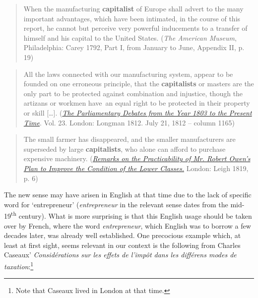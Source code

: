 \documentclass[output=paper]{langsci/langscibook}
\begin{document}
\begin{quote}
When the manufacturing \textbf{capitalist} of Europe shall advert to the
many important advantages, which have been intimated, in the course of
this report, he cannot but perceive very powerful inducements to a
transfer of himself and his capital to the United States. (\emph{The
American Museum}, Philadelphia: Carey 1792, Part I, from January to
June, Appendix II, p. 19)
\end{quote}

\begin{quote}
All the laws connected with our manufacturing system, appear to be
foun\-ded on one erroneous principle, that the \textbf{capitalists} or
masters are the only part to be protected against combination and
injustice, though the artizans or workmen have~an equal right to be
protected in their property or skill {[}\ldots{}{]}.
(\href{https://books.google.co.uk/books?id=f1dFAAAAYAAJ\&pg=PT537\&dq=\%
22capitalists\%22\&hl=de\&sa=X\&ved=0ahUKEwjI9r33rZbOAhUEuRQKHYi9BFo4ChDoAQgbMAA
}{\emph{The
Parliamentary Debates from the Year 1803 to the Present Time}}. Vol.
23. London: Longman 1812. July 21, 1812 -- column 1165)
\end{quote}

\begin{quote}
The small farmer has disappeared, and the smaller manufacturers are
superseded by large \textbf{capitalists}, who alone can afford to
purchase expensive machinery.
(\href{https://books.google.co.uk/books?id=oUlBAAAAYAAJ\&pg=PA6\&dq=\%
22capitalists\%22\&hl=de\&sa=X\&ved=0ahUKEwiK88jqr5bOAhUOrRQKHTg6DU04HhDoAQhVMAg
}{\emph{Remarks
on the Practicability of Mr. Robert Owen's Plan to Improve the Condition
of the Lower Classes.}} London: Leigh 1819, p. 6)
\end{quote}


The new sense may have arisen in English at that time due to the lack of 
specific word for `entrepreneur'
(\emph{entrepreneur} in the relevant sense dates from the
mid-19\textsuperscript{th} century). What is more surprising is that
this English usage should be taken over by French, where the word
\emph{entrepreneur}, which English was to borrow a few decades later,
was already well established. One precocious example which, at least at
first sight, seems relevant in our context is the following  from
Charles Caseaux' \emph{Considérations sur les effets de l'impôt dans les
différens modes de taxation}:\footnote{Note
  that Caseaux lived in London at that time.}
\end{document}

